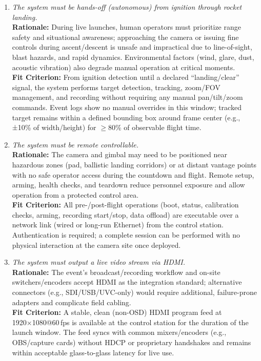 \documentclass[12pt]{article}
\begin{document}
\begin{enumerate}[label=MD-SL \arabic*., wide=0pt, leftmargin=*]
  \item \emph{The system must be hands-off (autonomous) from ignition through rocket landing.}\\[2mm]
        {\bf Rationale:} During live launches, human operators must prioritize range safety and situational awareness; approaching the camera or issuing fine controls during ascent/descent is unsafe and impractical due to line-of-sight, blast hazards, and rapid dynamics. Environmental factors (wind, glare, dust, acoustic vibration) also degrade manual operation at critical moments.\\
        {\bf Fit Criterion:} From ignition detection until a declared “landing/clear” signal, the system performs target detection, tracking, zoom/FOV management, and recording without requiring any manual pan/tilt/zoom commands. Event logs show no manual overrides in this window; tracked target remains within a defined bounding box around frame center (e.g., ±10\% of width/height) for $\ge$80\% of observable flight time.

  \item \emph{The system must be remote controllable.}\\[2mm]
        {\bf Rationale:} The camera and gimbal may need to be positioned near hazardous zones (pad, ballistic landing corridors) or at distant vantage points with no safe operator access during the countdown and flight. Remote setup, arming, health checks, and teardown reduce personnel exposure and allow operation from a protected control area.\\
        {\bf Fit Criterion:} All pre-/post-flight operations (boot, status, calibration checks, arming, recording start/stop, data offload) are executable over a network link (wired or long-run Ethernet) from the control station. Authentication is required; a complete session can be performed with no physical interaction at the camera site once deployed.

  \item \emph{The system must output a live video stream via HDMI.}\\[2mm]
        {\bf Rationale:} The event’s broadcast/recording workflow and on-site switchers/encoders accept HDMI as the integration standard; alternative connectors (e.g., SDI/USB/UVC-only) would require additional, failure-prone adapters and complicate field cabling.\\
        {\bf Fit Criterion:} A stable, clean (non-OSD) HDMI program feed at 1920×1080@60\,fps is available at the control station for the duration of the launch window. The feed syncs with common mixers/encoders (e.g., OBS/capture cards) without HDCP or proprietary handshakes and remains within acceptable glass-to-glass latency for live use.


\end{enumerate}
\end{document}
